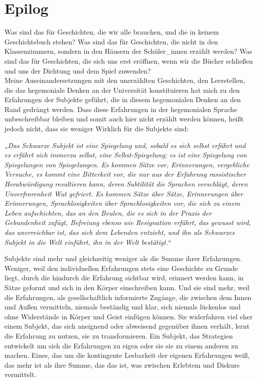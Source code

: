 \section{Epilog}
Was sind das für Geschichten, die wir alle brauchen, und die in
keinem Geschichtsbuch stehen? Was sind das für Geschichten, die nicht in den
Klassenzimmern, sondern in den Häusern der Schüler\_innen erzählt werden? Was
sind das für Geschichten, die sich uns erst eröffnen, wenn wir die Bücher
schließen und uns der Dichtung und dem Spiel zuwenden?\\

\noindent Meine Auseinandersetzungen mit den unerzählten Geschichten, den Leerstellen, die
das hegemoniale Denken an der Universität konstituieren hat mich zu den
Erfahrungen der Subjekte geführt, die in diesem hegemonialen Denken an den Rand
gedrängt werden. Dass diese Erfahrungen in der hegemonialen Sprache
unbeschreibbar bleiben und somit auch hier nicht erzählt werden  können, heißt jedoch nicht, dass sie weniger Wirklich für die Subjekte sind: 
\begin{myenv}
\textit{„Das Schwarze Subjekt ist eine Spiegelung und, sobald es sich selbst erfährt und
es erfährt sich immerzu selbst, eine Selbst-Spiegelung; es ist eine Spiegelung
von Spiegelungen von Spiegelungen. Es kommen Sätze vor, Erinnerungen,
vergebliche Versuche, es kommt eine Bitterkeit vor, die nur aus der Erfahrung
rassistischer Herabwürdigung resultieren kann, deren Subtilität die Sprachen
verschlägt, deren Unverfrorenheit Wut gefriert. Es kommen Sätze über Sätze,
Erinnerungen über Erinnerungen, Sprachlosigkeiten über Sprachlosigkeiten vor,
die sich zu einem Leben aufschichten, das an den Beulen, die es sich in der
Praxis der Gebundenheit zufügt, Befreiung ebenso wie Resignation erfährt, das
gewusst wird, das unerreichbar ist, das sich dem Lebenden entzieht, und ihn als
Schwarzes Subjekt in die Welt einführt, ihn in der Welt bestätigt.“\footnotemark
{}}
\end{myenv}
Subjekte sind mehr und gleichzeitig weniger als die Summe ihrer Erfahrungen.\\
Weniger, weil den individuellen Erfahrungen stets eine Geschichte zu Grunde
liegt, durch die hindurch die Erfahrung sichtbar wird, erinnert werden kann, in
Sätze geformt und sich in den Körper einschreiben kann. Und sie sind mehr, weil
die Erfahrungen, als gesellschaftlich informierte Zugänge, die zwischen dem
Innen und Außen vermitteln, niemals beständig und klar, sich niemals lückenlos
und ohne Widerstände in Körper und Geist einfügen können. Sie widerfahren viel
eher einem Subjekt, das sich aneignend oder abweisend gegenüber ihnen verhält,
lernt die Erfahrung zu nutzen, sie zu transformieren. Ein Subjekt, das
Strategien entwickelt um sich die Erfahrungen zu eigen oder sie sie zu einem
anderen zu machen. Eines, das um die kontingente Lesbarkeit der eigenen
Erfahrungen weiß, das mehr ist als ihre Summe, das das ist, was zwischen Erlebtem
und Diskurs vermittelt.\\

